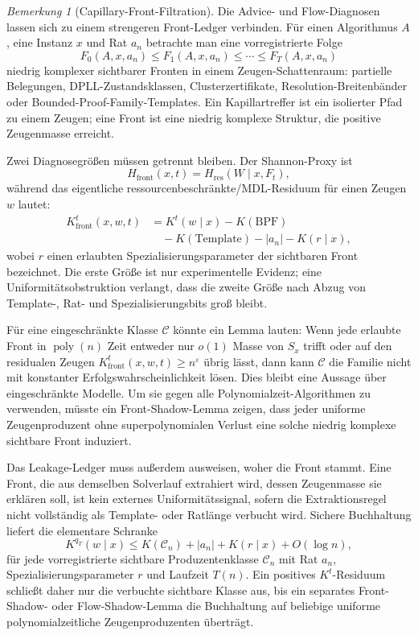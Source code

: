 \documentclass[aps,prd,twocolumn,superscriptaddress,nofootinbib]{revtex4-2}
\theoremstyle{definition}
\theoremstyle{remark}
\newtheorem{remark}[theorem]{Bemerkung}
\DeclareMathOperator{\poly}{poly}
\begin{document}
\begin{remark}[Capillary-Front-Filtration]\label{rem:capillary-front}
Die Advice- und Flow-Diagnosen lassen sich zu einem strengeren
Front-Ledger verbinden.  Für einen Algorithmus $A$, eine Instanz $x$ und
Rat $a_n$ betrachte man eine vorregistrierte Folge
\[
F_0(A,x,a_n)\leq F_1(A,x,a_n)\leq\cdots\leq F_T(A,x,a_n)
\]
niedrig komplexer sichtbarer Fronten in einem Zeugen-Schattenraum:
partielle Belegungen, DPLL-Zustandsklassen, Clusterzertifikate,
Resolution-Breitenbänder oder Bounded-Proof-Family-Templates.  Ein
Kapillartreffer ist ein isolierter Pfad zu einem Zeugen; eine Front ist
eine niedrig komplexe Struktur, die positive Zeugenmasse erreicht.

Zwei Diagnosegrößen müssen getrennt bleiben.  Der Shannon-Proxy ist
\[
H_{\mathrm{front}}(x,t)=H_{\mathrm{res}}(W\mid x,F_t),
\]
während das eigentliche ressourcenbeschränkte/MDL-Residuum für einen Zeugen
$w$ lautet:
\[
\begin{aligned}
K_{\mathrm{front}}^t(x,w,t)
  &=K^t(w\mid x)-K(\mathrm{BPF})\\
  &\quad -K(\mathrm{Template})-|a_n|-K(r\mid x),
\end{aligned}
\]
wobei $r$ einen erlaubten Spezialisierungsparameter der sichtbaren Front
bezeichnet.  Die erste Größe ist nur experimentelle Evidenz; eine
Uniformitätsobstruktion verlangt, dass die zweite Größe nach Abzug von
Template-, Rat- und Spezialisierungsbits groß bleibt.

Für eine eingeschränkte Klasse $\mathcal{C}$ könnte ein Lemma lauten: Wenn
jede erlaubte Front in $\poly(n)$ Zeit entweder nur $o(1)$ Masse von $S_x$
trifft oder auf den residualen Zeugen
$K_{\mathrm{front}}^t(x,w,t)\geq n^\varepsilon$ übrig lässt, dann kann
$\mathcal{C}$ die Familie nicht mit konstanter Erfolgswahrscheinlichkeit
lösen.  Dies bleibt eine Aussage über eingeschränkte Modelle.  Um sie gegen
alle Polynomialzeit-Algorithmen zu verwenden, müsste ein Front-Shadow-Lemma
zeigen, dass jeder uniforme Zeugenproduzent ohne superpolynomialen Verlust
eine solche niedrig komplexe sichtbare Front induziert.

Das Leakage-Ledger muss außerdem ausweisen, woher die Front stammt.  Eine
Front, die aus demselben Solverlauf extrahiert wird, dessen Zeugenmasse sie
erklären soll, ist kein externes Uniformitätssignal, sofern die Extraktionsregel
nicht vollständig als Template- oder Ratlänge verbucht wird.  Sichere
Buchhaltung liefert die elementare Schranke
\[
K^{q_T}(w\mid x)\leq K(\mathcal{C}_n)+|a_n|+K(r\mid x)+O(\log n),
\]
für jede vorregistrierte sichtbare Produzentenklasse $\mathcal{C}_n$ mit Rat
$a_n$, Spezialisierungsparameter $r$ und Laufzeit $T(n)$.  Ein positives
$K^t$-Residuum schließt daher nur die verbuchte sichtbare Klasse aus, bis ein
separates Front-Shadow- oder Flow-Shadow-Lemma die Buchhaltung auf beliebige
uniforme polynomialzeitliche Zeugenproduzenten überträgt.
\end{remark}
\end{document}
